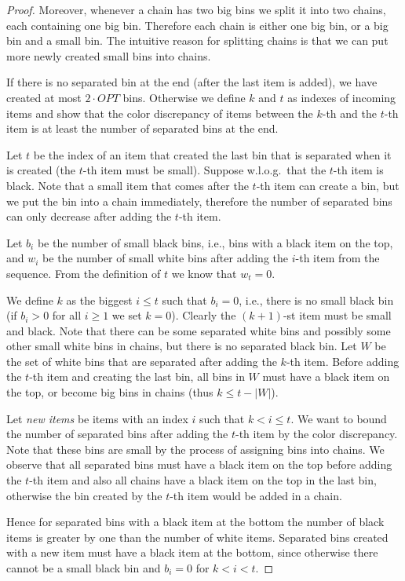 \documentclass[11pt,a4paper]{article}
\def\vari#1{\mathit{#1}}
\begin{document}
\begin{proof}
Moreover, whenever a chain has two big bins
we split it into two chains, each containing one big bin. 
Therefore each chain is either one big bin, or a big bin and a small bin.
The intuitive reason for splitting chains is that
we can put more newly created small bins into chains.

If there is no separated bin at the end (after the last item is added),
we have created at most $2 \cdot \vari{OPT}$ bins.
Otherwise we define $k$ and $t$ as indexes of incoming items
and show that the color discrepancy of items between the $k$-th and the $t$-th item is at least the number of separated bins at the end.

Let $t$ be the index of an item that created the last bin that is separated when it is created (the $t$-th item must be small).
Suppose w.l.o.g.\ that the $t$-th item is black.
Note that a small item that comes after the $t$-th item can create a bin,
but we put the bin into a chain immediately,
therefore the number of separated bins can only decrease after adding the $t$-th item.

Let $b_i$ be the number of small black bins, i.e., bins with a black item on the top,
and $w_i$ be the number of small white bins
after adding the $i$-th item from the sequence. From the definition of $t$ we know that $w_t = 0$.

We define $k$ as the biggest $i \leq t$ such that $b_i = 0$, i.e., there is no small black bin
(if $b_i > 0$ for all $i \geq 1$ we set $k = 0$).
Clearly the $(k + 1)$-st item must be small and black.
Note that there can be some separated white bins and possibly some other small white bins in chains,
but there is no separated black bin.
Let $W$ be the set of white bins that are separated after adding the $k$-th item.
Before adding the $t$-th item and creating the last bin, all bins in $W$ must have a black item on the top, or become big bins in chains (thus $k \leq t - |W|$).

Let \textit{new items} be items with an index $i$ such that $k < i \leq t$.
We want to bound the number of separated bins after adding the $t$-th item by the color discrepancy.
Note that these bins are small by the process of assigning bins into chains.
We observe that all separated bins must have a black item on the top before adding the $t$-th item
and also all chains have a black item on the top in the last bin,
otherwise the bin created by the $t$-th item would be added in a chain.

Hence for separated bins with a black item at the bottom the number of black items is greater by one than the number of white items.
Separated bins created with a new item must have a black item at the bottom,
since otherwise there cannot be a small black bin and $b_i = 0$ for $k < i < t$.


\end{proof}
\end{document}
